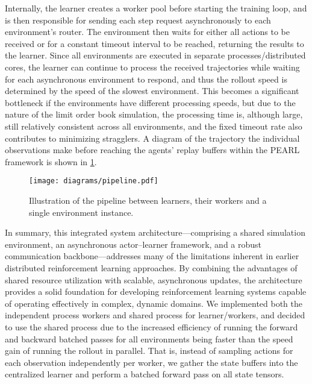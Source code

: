 \documentclass[11pt]{article}
\begin{document}
    Internally, the learner creates a worker pool before starting the training loop, and is then responsible
    for sending each step request asynchronously to each environment's router.
    The environment then waits for either all actions to be received or for a constant timeout interval to be reached, returning the results to the learner.
    Since all environments are executed in separate processes/distributed cores, the learner can continue to process the
    received trajectories while waiting for each asynchronous environment to respond,
    and thus the rollout speed is determined by the speed of the slowest environment.
    This becomes a significant bottleneck if the environments have different processing speeds,
    but due to the nature of the limit order book simulation, the processing time is, although large,
    still relatively consistent across all environments, and the fixed timeout rate also contributes to minimizing stragglers.
    A diagram of the trajectory the individual observations make before reaching the agents' replay buffers within the PEARL framework
    is shown in \cref{fig:pipeline}.

    \begin{figure}
        \centering
        \texttt{[image: diagrams/pipeline.pdf]}
        \caption{Illustration of the pipeline between learners, their workers and a single environment instance.}
        \label{fig:pipeline}
    \end{figure}

    In summary, this integrated system architecture—comprising a shared simulation environment, an asynchronous actor–learner framework, and
    a robust communication backbone—addresses many of the limitations inherent in earlier distributed reinforcement learning approaches.
    By combining the advantages of shared resource utilization with scalable, asynchronous updates, the architecture provides a solid foundation for
    developing reinforcement learning systems capable of operating effectively in complex, dynamic domains.
    We implemented both the independent process workers and shared process for learner/workers,
    and decided to use the shared process due to the increased efficiency of running the forward and backward batched passes
    for all environments being faster than the speed gain of running the rollout in parallel.
    That is, instead of sampling actions for each observation independently per worker,
    we gather the state buffers into the centralized learner and perform a batched forward pass on all state tensors.
\end{document}
